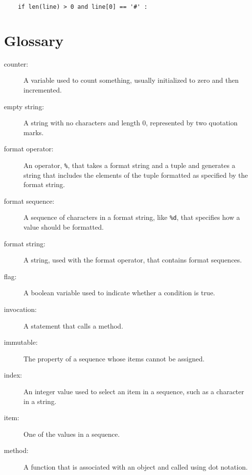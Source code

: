 {\beforeverb
\begin{verbatim}
    if len(line) > 0 and line[0] == '#' :
\end{verbatim}
\afterverb
%

\section{Glossary}

\begin{description}

\item[counter:] A variable used to count something, usually initialized
to zero and then incremented.

\item[empty string:] A string with no characters and length 0, represented
by two quotation marks.

\item[format operator:] An operator, {\tt \%}, that takes a format
string and a tuple and generates a string that includes
the elements of the tuple formatted as specified by the format string.

\item[format sequence:] A sequence of characters in a format string,
like {\tt \%d}, that specifies how a value should be formatted.

\item[format string:] A string, used with the format operator, that
contains format sequences.

\item[flag:] A boolean variable used to indicate whether a condition
is true.

\item[invocation:] A statement that calls a method.

\item[immutable:] The property of a sequence whose items cannot
be assigned.

\item[index:] An integer value used to select an item in
a sequence, such as a character in a string.

\item[item:] One of the values in a sequence.

\item[method:] A function that is associated with an object and called
using dot notation.


\end{description}}
